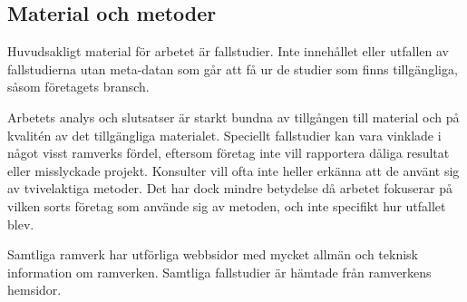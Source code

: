 	\subsection{Material och metoder}
		
		Huvudsakligt material för arbetet är fallstudier. Inte innehållet eller utfallen av fallstudierna utan meta-datan som går att få ur de studier som finns tillgängliga, såsom företagets bransch.
				
		Arbetets analys och slutsatser är starkt bundna av tillgången till material och på kvalitén av det tillgängliga materialet. Speciellt fallstudier kan vara vinklade i något visst ramverks fördel, eftersom företag inte vill rapportera dåliga resultat eller misslyckade projekt. Konsulter vill ofta inte heller erkänna att de använt sig av tvivelaktiga metoder.
		Det har dock mindre betydelse då arbetet fokuserar på vilken sorts företag som använde sig av metoden, och inte specifikt hur utfallet blev.
		
		Samtliga ramverk har utförliga webbsidor med mycket allmän och teknisk information om ramverken. Samtliga fallstudier är hämtade från ramverkens hemsidor.
		
	
	
		
